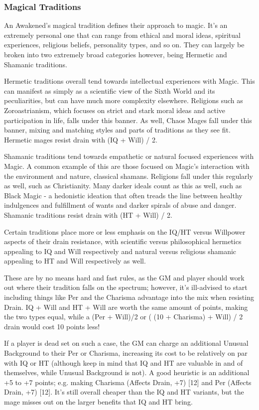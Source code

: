 \begin{multicols*}{3}
	\subsubsection{Magical Traditions}
	
	An Awakened's magical tradition defines their approach to magic. It's an extremely personal one that can range from ethical and moral ideas, spiritual experiences, religious beliefs, personality types, and so on. They can largely be broken into two extremely broad categories however, being Hermetic and Shamanic traditions.
	
	Hermetic traditions overall tend towards intellectual experiences with Magic. This can manifest as simply as a scientific view of the Sixth World and its peculiarities, but can have much more complexity elsewhere. Religions such as Zoroastrianism, which focuses on strict and stark moral ideas and active participation in life, falls under this banner. As well, Chaos Mages fall under this banner, mixing and matching styles and parts of traditions as they see fit. Hermetic mages resist drain with (IQ + Will) / 2.
	
	Shamanic traditions tend towards empathetic or natural focused experiences with Magic. A common example of this are those focused on Magic's interaction with the environment and nature, classical shamans. Religions fall under this regularly as well, such as Christianity. Many darker ideals count as this as well, such as Black Magic - a hedonistic ideation that often treads the line between healthy indulgences and fulfillment of wants and darker spirals of abuse and danger. Shamanic traditions resist drain with (HT + Will) / 2.
	
	Certain traditions place more or less emphasis on the IQ/HT versus Willpower aspects of their drain resistance, with scientific versus philosophical hermetics appealing to IQ and Will respectively and natural versus religious shamanic appealing to HT and Will respectively as well.
	
	These are by no means hard and fast rules, as the GM and player should work out where their tradition falls on the spectrum; however, it's ill-advised to start including things like Per and the Charisma advantage into the mix when resisting Drain. IQ + Will and HT + Will are worth the same amount of points, making the two types equal, while a (Per + Will)/2 or ( (10 + Charisma) + Will) / 2 drain would cost 10 points less! 
	
	If a player is dead set on such a case, the GM can charge an additional Unusual Background to their Per or Charisma, increasing its cost to be relatively on par with IQ or HT (although keep in mind that IQ and HT are valuable in and of themselves, while Unusual Background is not). A good heuristic is an additional +5 to +7 points; e.g. making Charisma (Affects Drain, +7) [12] and Per (Affects Drain, +7) [12]. It's still overall cheaper than the IQ and HT variants, but the mage misses out on the larger benefits that IQ and HT bring.
	

\end{multicols*}
